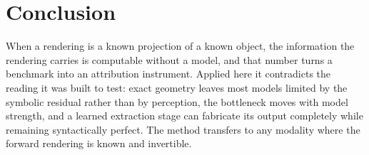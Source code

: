 \section{Conclusion}
When a rendering is a known projection of a known object, the information the rendering carries is
computable without a model, and that number turns a benchmark into an attribution instrument. Applied here
it contradicts the reading it was built to test: exact geometry leaves most models limited by the symbolic
residual rather than by perception, the bottleneck moves with model strength, and a learned extraction
stage can fabricate its output completely while remaining syntactically perfect. The method transfers to
any modality where the forward rendering is known and invertible.
